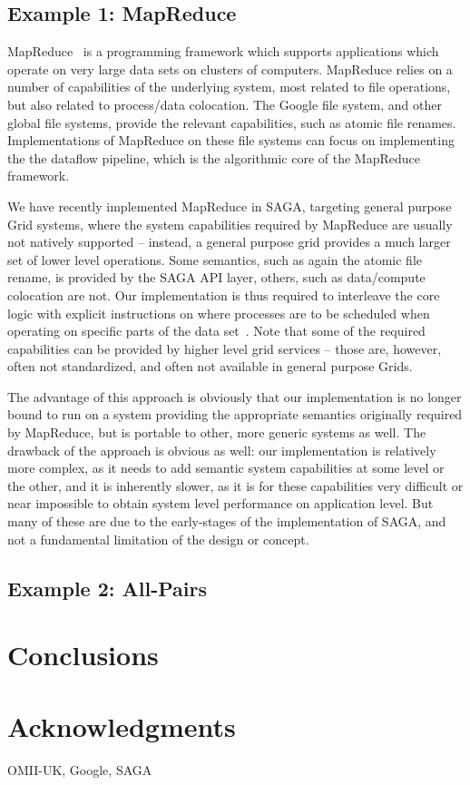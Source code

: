 \documentclass{article}
\newcommand{\up}{\vspace*{-1em}}
\begin{document}
 \up
 \subsection{Example 1: MapReduce}

  MapReduce~\cite{mapreduce-paper} is a programming framework which
  supports applications which operate on very large data sets on
  clusters of computers.  MapReduce relies on a number of capabilities
  of the underlying system, most related to file operations, but also
  related to process/data colocation.  The Google file system, and
  other global file systems, provide the relevant capabilities, such
  as atomic file renames.  Implementations of MapReduce on these file
  systems can focus on implementing the the dataflow pipeline, which
  is the algorithmic core of the MapReduce framework.

  We have recently implemented MapReduce in SAGA, targeting general
  purpose Grid systems, where the system capabilities required by
  MapReduce are usually not natively supported -- instead, a general
  purpose grid provides a much larger set of lower level operations.
  Some semantics, such as again the atomic file rename, is provided by
  the SAGA API layer, others, such as data/compute colocation are not.
  Our implementation is thus required to interleave the core logic
  with explicit instructions on where processes are to be scheduled
  when operating on specific parts of the data set~\cite{gsoc-saga}.
  Note that some of the required capabilities can be provided by
  higher level grid services -- those are, however, often not
  standardized, and often not available in general purpose Grids.

  The advantage of this approach is obviously that our implementation
  is no longer bound to run on a system providing the appropriate
  semantics originally required by MapReduce, but is portable to
  other, more generic systems as well.  The drawback of the approach
  is obvious as well: our implementation is relatively more complex,
  as it needs to add semantic system capabilities at some level or the
  other, and it is inherently slower, as it is for these capabilities
  very difficult or near impossible to obtain system level performance
  on application level.  But many of these are due to the early-stages
  of the implementation of SAGA, and not a fundamental limitation of
  the design or concept.

 \subsection{Example 2: All-Pairs}

\section{Conclusions}\label{sec:conclusion}

\section{Acknowledgments}
\label{sec:acks}

OMII-UK, Google, SAGA

%
%
\end{document}
